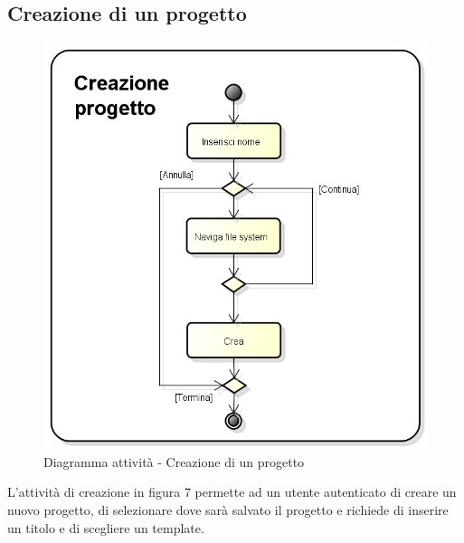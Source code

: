 \subsection{Creazione di un progetto}
\begin{figure}[h] 
	\centering 
	\includegraphics[scale=0.3] {img/activity_creazione.png} 
	\caption{Diagramma attività - Creazione di un progetto} 
\end{figure}
L'attività di creazione in figura 7 permette ad un utente autenticato di creare un nuovo progetto, di selezionare dove sarà salvato il progetto e richiede di inserire un titolo e di scegliere un template.
\newpage


